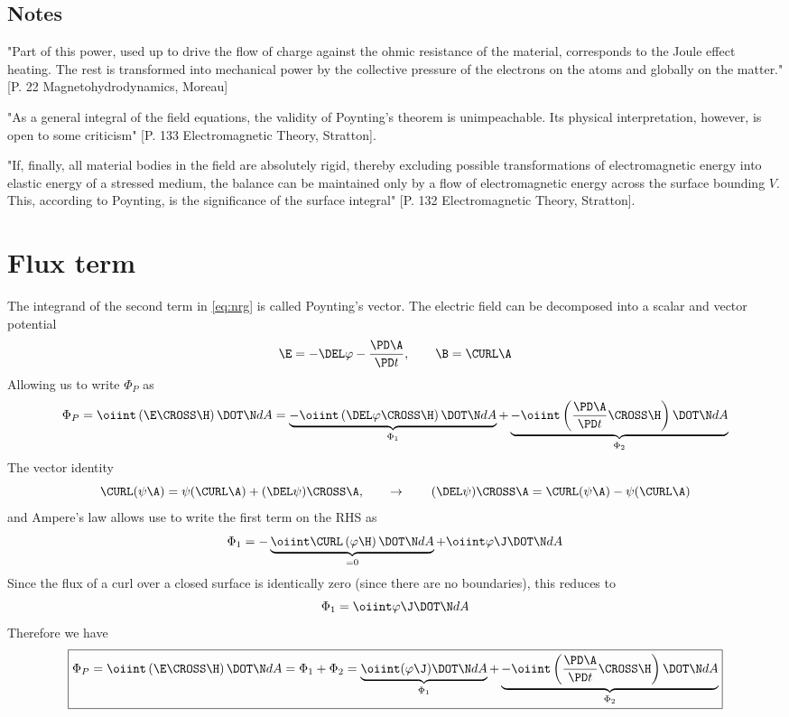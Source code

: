 \documentclass[11pt]{article}
\begin{document}
\subsection{Notes}
"Part of this power, used up to drive the flow of charge against the ohmic resistance of the material, corresponds to the Joule effect heating. The rest is transformed into mechanical power by the collective pressure of the electrons on the atoms and globally on the matter." [P. 22 Magnetohydrodynamics, Moreau]

"As a general integral of the field equations, the validity of Poynting's theorem is unimpeachable. Its physical interpretation, however, is open to some criticism" [P. 133 Electromagnetic Theory, Stratton].

"If, finally, all material bodies in the field are absolutely rigid, thereby excluding possible transformations of electromagnetic energy into elastic energy of a stressed medium, the balance can be maintained only by a flow of electromagnetic energy across the surface bounding $V$. This, according to Poynting, is the significance of the surface integral" [P. 132 Electromagnetic Theory, Stratton].

\section{Flux term}
The integrand of the second term in \ref{eq:nrg} is called Poynting's vector. The electric field can be decomposed into a scalar and vector potential
\begin{equation}
	\E = -\DEL \varphi - \frac{\PD \A}{\PD t}, \qquad \B = \CURL \A
\end{equation}
Allowing us to write $\Phi_P$ as
\begin{equation}
	\Phi_P = \oiint \left( \E \CROSS \H \right) \DOT \N dA =
	\underbrace{- \oiint \left( \DEL \varphi \CROSS \H \right) \DOT \N dA}_{\Phi_1} +
	\underbrace{- \oiint \left( \frac{\PD \A}{\PD t} \CROSS \H \right) \DOT \N dA}_{\Phi_2}
\end{equation}
The vector identity
\begin{equation}
	\CURL (\psi \A) = \psi (\CURL \A) + (\DEL \psi) \CROSS \A
	, \qquad \rightarrow \qquad
	(\DEL \psi) \CROSS \A = \CURL (\psi \A) - \psi (\CURL \A)
\end{equation}
and Ampere's law allows use to write the first term on the RHS as
\begin{equation}
	\Phi_1 = - \underbrace{\oiint \CURL \left(\varphi \H \right) \DOT \N dA}_{= 0}
	+ \oiint \varphi \J \DOT \N dA
\end{equation}
Since the flux of a curl over a closed surface is identically zero (since there are no boundaries), this reduces to
\begin{equation}
	\Phi_1 = \oiint \varphi \J \DOT \N dA
\end{equation}
Therefore we have
\begin{equation}
	\boxed{
	\Phi_P = \oiint \left( \E \CROSS \H \right) \DOT \N dA = \Phi_1 + \Phi_2 =
	\underbrace{\oiint (\varphi \J) \DOT \N dA}_{\Phi_1} +
	\underbrace{- \oiint \left( \frac{\PD \A}{\PD t} \CROSS \H \right) \DOT \N dA}_{\Phi_2}
	}
\end{equation}
\end{document}
